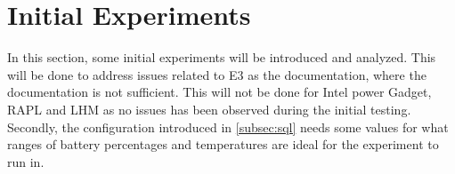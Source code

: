 \section{Initial Experiments}\label{sec:initial_experiments}




In this section, some initial experiments will be introduced and analyzed. This will be done to address issues related to E3 as the documentation, where the documentation is not sufficient. This will not be done for Intel power Gadget, RAPL and LHM as no issues has been observed during the initial testing. Secondly, the configuration introduced in \cref{subsec:sql} needs some values for what ranges of battery percentages and temperatures are ideal for the experiment to run in.








% 

